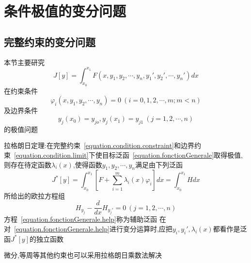 \section{条件极值的变分问题}
\subsection{完整约束的变分问题}
本节主要研究
\begin{equation}
J[y]=\int_{x_0}^{x_1}F(x,y_1,y_2, \cdots , y_n,y_1',y_2', \cdots , y_n')dx
\label{equation.fonctionGenerale}
\end{equation}
在约束条件
\begin{equation}
\varphi_i(x,y_1,y_2, \cdots , y_n)=0 ~ (i=0,1,2,\cdots ,m;m<n)
\label{equation.condition.constraint}
\end{equation}
及边界条件
\begin{equation}
y_j(x_0)=y_{jo},y_j(x_1)=y_{j1}~ (j=1,2,\cdots ,n)
\label{equation.condition.limit}
\end{equation}
的极值问题
\begin{theorem}
拉格朗日定理:在完整约束~\ref{equation.condition.constraint}和边界约束~\ref{equation.condition.limit}下使目标泛函~\ref{equation.fonctionGenerale}取得极值,则存在待定函数$\lambda_i(x)$,使得函数$y_1,y_2,\cdots,y_n$满足由下列泛函
\begin{equation}
J^{*}[y]=\int_{x_0}^{x_1}[F+\sum_{i=1}^{m}\lambda_i(x)\varphi_i]dx=\int_{x_0}^{x_1}Hdx
\label{equation.fonctionGenerale.help}
\end{equation}
所给出的欧拉方程组
$$H_{y_j} - \frac{d}{dx}H_{y_{j}'}=0 ~ (j=1,2,\cdots,n)$$
方程~\ref{equation.fonctionGenerale.help}称为辅助泛函
在对~\ref{equation.fonctionGenerale.help}进行变分运算时,应把$y_i,y_i',\lambda_i(x)$都看作是泛函$J^{*}[y]$的独立函数
\end{theorem}
微分,等周等其他约束也可以采用拉格朗日乘数法解决
